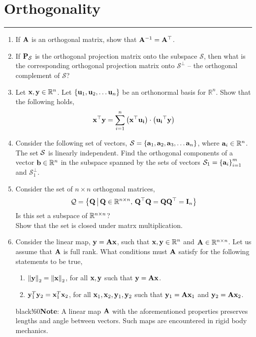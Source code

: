 \documentclass[
10pt, %
a4paper, %
oneside, %
headinclude,footinclude, %
BCOR5mm, %
]{scrartcl}
\def\mf{\ensuremath\mathbf}
\def\mb{\ensuremath\mathbb}
\begin{document}
\newpage
\section{Orthogonality}
\hrule
\vspace{0.5cm}
\begin{enumerate}
	\item If $\mf{A}$ is an orthogonal matrix, show that $\mf{A}^{-1} = \mf{A}^\top$.
	
	\item If $\mf{P}_{\mathcal{S}}$ is the orthogonal projection matrix onto the subspace $\mathcal{S}$, then what is the corresponding orthogonal projection matrix onto $\mathcal{S}^{\perp}$ -- the orthogonal complement of $\mathcal{S}$?
	
	\item Let $\mf{x}, \mf{y} \in \mathbb{R}^n$. Let $\cc{\mf{u}_1, \mf{u}_2, \ldots \mf{u}_n}$ be an orthonormal basis for $\mathbb{R}^n$. Show that the following holds,
	\[ \mf{x}^\top\mf{y} = \sum_{i=1}^n \pp{\mf{x}^\top \mf{u_i}} \cdot \pp{\mf{u_i}^\top \mf{y}} \]
	
	\item Consider the following set of vectors, $\mathcal{S} = \left\{ \mf{a}_1, \mf{a}_2, \mf{a}_3, \ldots \mf{a}_n \right\}$, where $\mf{a}_i \in \mathbb{R}^n$. The set $\mathcal{S}$ is linearly independent. Find the orthogonal components of a vector $\mf{b} \in \mathbb{R}^n$ in the subspace spanned by the sets of vectors $\mathcal{S}_1 = \left\{ \mf{a}_i \right\}_{i=1}^m$ and $\mathcal{S}_1^\perp$.
	
	\item Consider the set of $n \times n$ orthogonal matrices,
	\[ \mc{Q} = \left\{ \mf{Q} \, \big \vert \, \mf{Q} \in \mb{R}^{n \times n}, \, \mf{Q}^\top\mf{Q} = \mf{Q}\mf{Q}^\top = \mf{I}_n  \right\} \] 
	Is this set a subspace of $\mb{R}^{n \times n}$? \\
	Show that the set is closed under matrx multiplication.
	
    \item Consider the linear map, $\mf{y} = \mf{Ax}$, such that $\mf{x}, \mf{y} \in \mb{R}^n$ and $\mf{A} \in \mb{R}^{n \times n}$. Let us assume that $\mf{A}$ is full rank. What conditions must $\mf{A}$ satisfy for the following statements to be true,
    \begin{enumerate}
        \item $\left\lVert \mf{y}\right\rVert_2 = \left\lVert \mf{x}\right\rVert_2$, for all $\mf{x}, \mf{y}$ such that $\mf{y} = \mf{Ax}$.
        \item $\mf{y}_1^T\mf{y}_2 = \mf{x}_1^T\mf{x}_2$, for all $\mf{x}_1, \mf{x}_2, \mf{y}_1, \mf{y}_2$ such that $\mf{y}_1 = \mf{A}\mf{x}_1$ and $\mf{y}_2 = \mf{A}\mf{x}_2$. 
    \end{enumerate}
    \vspace{-0.1cm}
    \begin{color}{black!60}\small{\textbf{Note}: A linear map $\mf{A}$ with the aforementioned properties preserves lengths and angle between vectors. Such maps are encountered in rigid body mechanics.}
    \end{color}


\end{enumerate}
\end{document}
